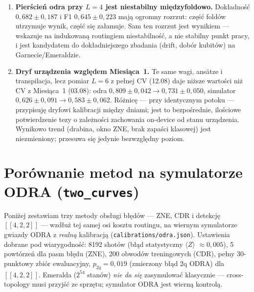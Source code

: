 \documentclass[11pt,a4paper]{article}
\begin{document}
\begin{enumerate}
\item \textbf{Pierścień odra przy $L{=}4$ jest niestabilny międzyfoldowo.} Dokładność
      $0{,}682\pm0{,}187$ i F1 $0{,}645\pm0{,}223$ mają ogromny rozrzut: część foldów utrzymuje
      wynik, część się załamuje. Sam ten rozrzut jest wynikiem --- wskazuje na indukowaną
      routingiem niestabilność, a nie stabilny punkt pracy, i jest kandydatem do dokładniejszego
      zbadania (drift, dobór kubitów) na Garnecie/Emeraldzie.

\item \textbf{Dryf urządzenia względem Miesiąca~1.} Te same wagi, ansätze i transpilacja, lecz
      pomiar $L{=}6$ z pełnej CV (12.08) daje niższe wartości niż CV z Miesiąca~1 (03.08):
      odra $0{,}809\pm0{,}042 \to 0{,}731\pm0{,}050$, simulator $0{,}626\pm0{,}091 \to
      0{,}583\pm0{,}062$. Różnicę --- przy identycznym potoku --- przypisuję dryfowi kalibracji
      między dniami; jest to bezpośrednie, ilościowe potwierdzenie tezy o zależności zachowania
      on-device od stanu urządzenia. Wynikowo trend (drabina, okno ZNE, brak zapaści klasowej)
      jest niezmieniony; przesuwa się jedynie bezwzględny poziom.

\end{enumerate}

\section{Porównanie metod na symulatorze ODRA (\texttt{two\_curves})}
\label{sec:method-comparison}

Poniżej zestawiam trzy metody obsługi błędów --- ZNE, CDR i detekcję $[[4,2,2]]$ --- wzdłuż tej
samej osi kosztu routingu, na wiernym symulatorze gwiazdy ODRA z \emph{realną} kalibracją
(\texttt{calibrations/odra.json}). Ustawienia dobrane pod wiarygodność: 8192 shotów (błąd
statystyczny $\langle Z\rangle$ ${\approx}0{,}005$), 5 powtórzeń dla pasm błędu (ZNE), 200 obwodów
treningowych (CDR), pełny 30-punktowy zbiór ewaluacyjny, $p_{2q}=0{,}019$ (zmierzony błąd 2q
ODRA) dla $[[4,2,2]]$. Emeralda ($2^{54}$ stanów) \emph{nie da się} zasymulować klasycznie ---
cross-topology musi przyjść ze sprzętu; symulator ODRA jest wierną kontrolą.
\end{document}
